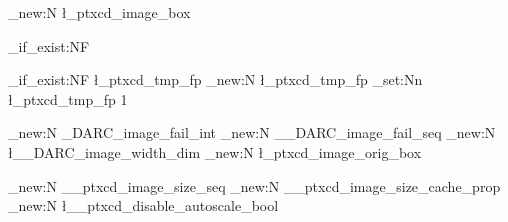 \makeatletter
\ExplSyntaxOn
\box_new:N \l_ptxcd_image_box

\cs_if_exist:NF \if@DARCinQuestion {\newif\if@DARCinQuestion}

\fp_if_exist:NF \l_ptxcd_tmp_fp {\fp_new:N \l_ptxcd_tmp_fp}
\fp_set:Nn \l_ptxcd_tmp_fp  {1}

\int_new:N \g_DARC_image_fail_int
\seq_new:N \g__DARC_image_fail_seq
\dim_new:N \l__DARC_image_width_dim
\box_new:N \l_ptxcd_image_orig_box

\newcommand*{\getDarcImageFactor}{\fp_use:N  \l_ptxcd_tmp_fp}




\seq_new:N  \g__ptxcd_image_size_seq
\prop_new:N \g__ptxcd_image_size_cache_prop
\bool_new:N \l__ptxcd_disable_autoscale_bool
\newcommand*{\disableDARCautoscale}{\bool_set_true:N  \l__ptxcd_disable_autoscale_bool}

